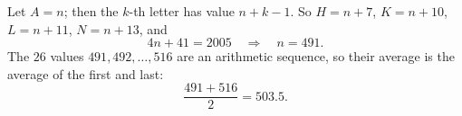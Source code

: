 Let $A=n$; then the $k$-th letter has value $n+k-1$. So $H=n+7$, $K=n+10$, $L=n+11$, $N=n+13$, and
\[
4n+41=2005\quad\Longrightarrow\quad n=491 .
\]
The $26$ values $491,492,\dots,516$ are an arithmetic sequence, so their average is the average of the first and last:
\[
\dfrac{491+516}{2}=\boxed{503.5}.
\]
